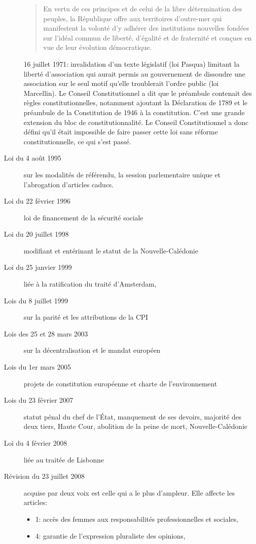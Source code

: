 \documentclass[math]{cours}
\begin{document}
\begin{description}
\begin{quote}
		      En vertu de ces principes et de celui de la libre détermination des peuples, la République offre aux territoires d'outre-mer qui manifestent la volonté d'y adhérer des institutions nouvelles fondées sur l'idéal commun de liberté, d'égalité et de fraternité et conçues en vue de leur évolution démocratique.
	      \end{quote}
	      16 juillet 1971: invalidation d'un texte législatif (loi Pasqua) limitant la liberté d'association qui aurait permis au gouvernement de dissoudre une association sur le seul motif qu'elle troublerait l'ordre public (loi Marcellin).
	      Le Conseil Constitutionnel a dit que le préambule contenait des règles constitutionnelles, notamment ajoutant la Déclaration de 1789 et le préambule de la Constitution de 1946 à la constitution.
	      C'est une grande extension du bloc de constitutionnalité.
	      Le Conseil Constitutionnel a donc défini qu'il était impossible de faire passer cette loi sans réforme constitutionnelle, ce qui s'est passé.
	\item[Loi du 4 août 1995] sur les modalités de référendu, la session parlementaire unique et l'abrogation d'articles caducs.
	\item[Loi du 22 février 1996] loi de financement de la sécurité sociale
	\item[Loi du 20 juillet 1998] modifiant et entérinant le statut de la Nouvelle-Calédonie
	\item[Loi du 25 janvier 1999] liée à la ratification du traité d'Amsterdam,
	\item[Lois du 8 juillet 1999] sur la parité et les attributions de la CPI
	\item[Lois des 25 et 28 mars 2003] sur la décentralisation et le mandat européen
	\item[Lois du 1er mars 2005] projets de constitution européenne et charte de l'environnement
	\item[Lois du 23 février 2007] statut pénal du chef de l'État, manquement de ses devoirs, majorité des deux tiers, Haute Cour, abolition de la peine de mort, Nouvelle-Calédonie
	\item[Loi du 4 février 2008] liée au traitée de Lisbonne
	\item[Révision du 23 juillet 2008] acquise par deux voix est celle qui a le plus d'ampleur.
	      Elle affecte les articles:
	      \begin{itemize}
		      \item 1: accès des femmes aux responsabilités professionnelles et sociales,
		      \item 4: garantie de l'expression pluraliste des opinions,

\end{itemize}
\end{description}
\end{document}
